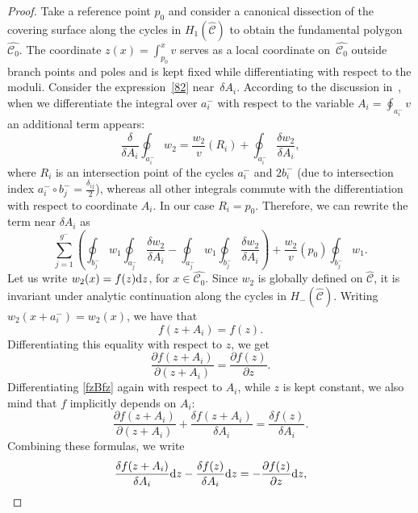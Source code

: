 \documentclass[pdftex]{sigma}
\numberwithin{equation}{section}
\theoremstyle{definition}
\begin{document}
\begin{proof}
Take a reference point $p_0$ and consider a canonical dissection of the covering surface along the cycles in $H_1(\hat{\mathcal{C}})$ to obtain the fundamental polygon $\hat{\mathcal{C}_0}$. The coordinate $z(x)=\int^x_{p_0}v$ serves as a local coordinate on~$\hat{\mathcal{C}_0}$ outside branch points and poles and is kept fixed while differentiating with respect to the moduli. Consider the expression~\eqref{82} near~$\delta A_i$. According to the discussion in~\cite{Kokotov_2009}, when we differentiate the integral over $a^-_i$ with respect to the variable $A_i=\oint_{a^-_i}v$ an additional term appears:
\begin{equation*}%
\frac{\delta}{\delta A_i}\oint_{a^-_i}w_2=\frac{w_2}{v}(R_i)+\oint_{a^-_i}\frac{\delta w_2}{\delta A_i},
\end{equation*}
where $R_i$ is an intersection point of the cycles $a^-_i$ and $2b^-_i$ (due to intersection index $a_i^- \circ b_j^- =\frac{\delta_{ij}}{2}$), whereas all other integrals commute with the differentiation with respect to coordinate $A_i.$ In our case $R_i=p_0.$ Therefore, we can rewrite the term near $\delta A_i$ as
\begin{equation}\label{85}
\sum^{g^-}_{j=1}\left(\oint_{b^-_j} w_1 \oint_{a^-_j}\frac{\delta w_2}{\delta A_i}-\oint_{a^-_j} w_1 \oint_{b^-_j}\frac{\delta w_2}{\delta A_i}\right)+\frac{w_2}{v}(p_0)\oint_{b^-_j} w_1.
\end{equation}
Let us write
$w_2(x)=f(z){\rm d}z$, for $x \in \hat{\mathcal{C}_0}$. Since $w_2$ is globally defined on $\hat{\mathcal{C}}$,
it is invariant under analytic continuation along the cycles in $H_{-}(\hat{\mathcal{C}})$.
Writing $w_2(x+a^-_i)=w_2(x)$, we have that
\begin{equation}\label{fzBfz}
f(z+A_i)=f(z).
\end{equation}
Differentiating this equality with respect to $z$, we get
\begin{equation*}
\frac{\partial f(z+A_i)}{\partial (z+A_i)}=\frac{\partial f(z)}{\partial z}.
\end{equation*}
Differentiating \eqref{fzBfz} again with respect to $A_i$, while $z$ is kept constant, we also mind that $f$ implicitly depends on $A_i$:
\begin{equation*}
\frac{\partial f(z+A_i)}{\partial (z+A_i)}+\frac{\delta f(z+A_i)}{\delta A_i}=\frac{\delta f(z)}{\delta A_i}.
\end{equation*}
Combining these formulas, we write
\begin{equation*}
\frac{\delta f(z+A_i)}{\delta A_i}{\rm d}z-\frac{\delta f(z)}{\delta A_i}{\rm d}z=-\frac{\partial f(z)}{\partial z}{\rm d}z,

\end{equation*}
\end{proof}
\end{document}
